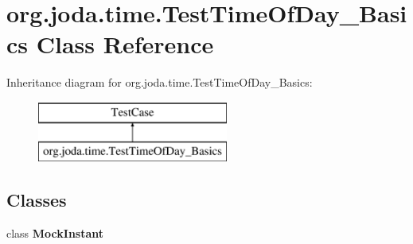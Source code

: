 \hypertarget{classorg_1_1joda_1_1time_1_1_test_time_of_day___basics}{\section{org.\-joda.\-time.\-Test\-Time\-Of\-Day\-\_\-\-Basics Class Reference}
\label{classorg_1_1joda_1_1time_1_1_test_time_of_day___basics}
}
Inheritance diagram for org.\-joda.\-time.\-Test\-Time\-Of\-Day\-\_\-\-Basics\-:\begin{figure}[H]
\begin{center}
\leavevmode
\includegraphics[height=2.000000cm]{classorg_1_1joda_1_1time_1_1_test_time_of_day___basics}
\end{center}
\end{figure}
\subsection*{Classes}
\begin{DoxyCompactItemize}
\item 
class {\bfseries Mock\-Instant}
\end{DoxyCompactItemize}
